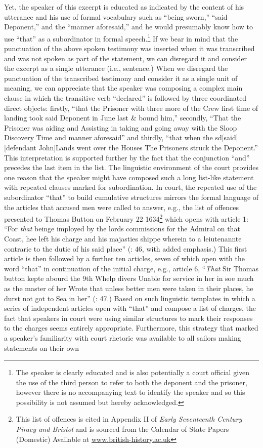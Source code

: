 Yet, the speaker of this excerpt is educated as indicated by the content of his utterance and his use of formal vocabulary such as “being sworn,” “said Deponent,” and the “manner aforesaid,” and he would presumably know how to use “that” as a subordinator in formal speech.\footnote{The speaker is clearly educated and is also potentially a court official given the use of the third person to refer to both the deponent and the prisoner, however there is no accompanying text to identify the speaker and so this possibility is not assumed but hereby acknowledged.} If we bear in mind that the punctuation of the above spoken testimony was inserted when it was transcribed and was not spoken as part of the statement, we can disregard it and consider the excerpt as a single utterance (i.e., sentence.) When we disregard the punctuation of the transcribed testimony and consider it as a single unit of meaning, we can appreciate that the speaker was composing a complex main clause in which the transitive verb “declared” is followed by three coordinated direct objects: firstly, “that the Prisoner with three more of the Crew first time of landing took said Deponent in June last \& bound him,” secondly, “That the Prisoner was aiding and Assisting in taking and going away with the Sloop Discovery Time and manner aforesaid” and thirdly, “that when the sd[said] [defendant John]Lands went over the Houses The Prisoners struck the Deponent.” This interpretation is supported further by the fact that the conjunction “and” precedes the last item in the list. The linguistic environment of the court provides one reason that the speaker might have composed such a long list-like statement with repeated clauses marked for subordination. In court, the repeated use of the subordinator “that” to build cumulative structures mirrors the formal language of the articles that accused men were called to answer, e.g., the list of offences presented to Thomas Button on February 22 1634\footnote{This list of offences is cited in Appendix II of \textit{Early Seventeenth Century Piracy and Bristol} \citep[46-48]{Hill2013} and is sourced from the Calendar of State Papers (Domestic) Available at \href{http://www.british-history.ac.uk/}{{www.british-history.ac.uk}}} which opens with article 1: “For \textit{that} beinge imployed by the lords commissions for the Admiral on that Coast, hee left his charge and his majasties shippe wherein to a leiutenannte contrarie to the dutie of his said place” (\citealt{Hill2013}: 46, with added emphasis.) This first article is then followed by a further ten articles, seven of which open with the word “that” in continuation of the initial charge, e.g., article 6, “\textit{That} Sir Thomas button kepte abourd the 9th Whelp divers Unable for service in her in soe much as the master of her Wrote that unless better men were taken in their places, he durst not got to Sea in her” (\citealt{Hill2013}: 47.) Based on such linguistic templates in which a series of independent articles open with “that” and compose a list of charges, the fact that speakers in court were using similar structures to mark their responses to the charges seems entirely appropriate. Furthermore, this strategy that marked a speaker’s familiarity with court rhetoric was available to all sailors making statements on their own 